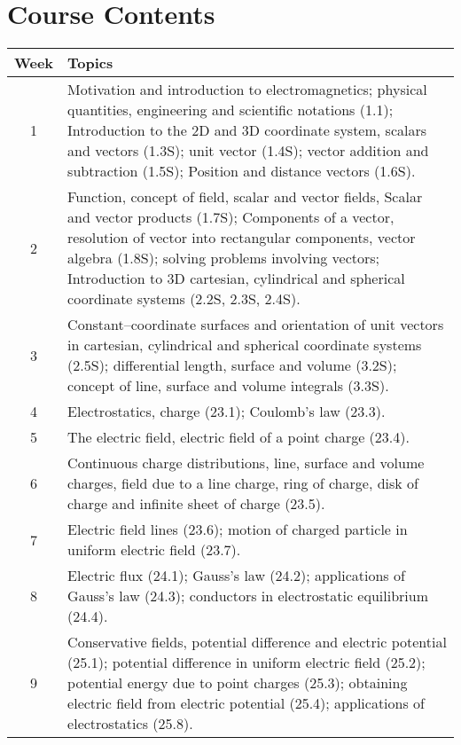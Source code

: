 \documentclass[12pt,a4paper]{article}
\begin{document}
\section{Course Contents}
\begin{center}
\vspace{-0.5cm}
	\begin{longtable}{|c|p{13cm}|}
	\hline \hline
		\rule{0pt}{2.6ex} \textbf{Week} & \textbf{Topics}\\
		\hline
		1 \rule{0pt}{2.6ex} & Motivation and introduction to electromagnetics; physical quantities, engineering and scientific notations (1.1); Introduction to the 2D and 3D coordinate system, scalars and vectors (1.3S); unit vector (1.4S); vector addition and subtraction (1.5S); Position and distance vectors (1.6S).\\
		\hline
		2 \rule{0pt}{2.6ex} & Function, concept of field, scalar and vector fields, Scalar and vector products (1.7S); Components of a vector, resolution of vector into rectangular components, vector algebra (1.8S); solving problems involving vectors; Introduction to 3D cartesian, cylindrical and spherical coordinate systems (2.2S, 2.3S, 2.4S).\\
		\hline
		3 \rule{0pt}{2.6ex} & Constant--coordinate surfaces and orientation of unit vectors in cartesian, cylindrical and spherical coordinate systems (2.5S); differential length, surface and volume (3.2S); concept of line, surface and volume integrals (3.3S).\\
		\hline
		4 \rule{0pt}{2.6ex} & Electrostatics, charge (23.1); Coulomb's law (23.3).\\
		\hline
		5 \rule{0pt}{2.6ex} &  The electric field, electric field of a point charge (23.4).\\
		\hline
		6 \rule{0pt}{2.6ex} & Continuous charge distributions, line, surface and volume charges,  field due to a line charge, ring of charge, disk of charge and infinite sheet of charge (23.5).\\
		\hline
		7 \rule{0pt}{2.6ex} & Electric field lines (23.6); motion of charged particle in uniform electric field (23.7).\\
		\hline
		8 \rule{0pt}{2.6ex} & Electric flux (24.1); Gauss's law (24.2); applications of Gauss's law (24.3); conductors in electrostatic equilibrium (24.4).\\
		\hline
		9 \rule{0pt}{2.6ex} & Conservative fields, potential difference and electric potential (25.1); potential difference in uniform electric field (25.2); potential energy due to point charges (25.3); obtaining electric field from electric potential (25.4); applications of electrostatics (25.8).\\

\end{longtable}
\end{center}
\end{document}
